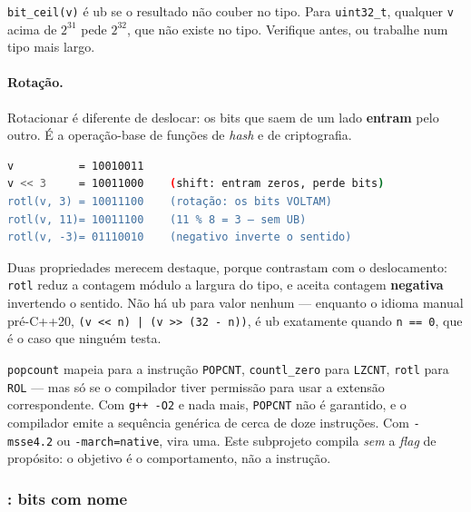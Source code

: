 \begin{armadilha}
\texttt{bit\_ceil(v)} é \gls{ub} se o resultado não couber no tipo. Para
\texttt{uint32\_t}, qualquer \texttt{v} acima de $2^{31}$ pede $2^{32}$, que não
existe no tipo. Verifique antes, ou trabalhe num tipo mais largo.
\end{armadilha}

\paragraph{Rotação.} Rotacionar é diferente de deslocar: os bits que saem de um
lado \textbf{entram} pelo outro. É a operação-base de funções de \emph{hash} e
de criptografia.

\begin{lstlisting}[style=bt, language=bash,
    caption={Saída de \texttt{src/bits/}: deslocamento contra rotação.}]
v          = 10010011
v << 3     = 10011000    (shift: entram zeros, perde bits)
rotl(v, 3) = 10011100    (rotação: os bits VOLTAM)
rotl(v, 11)= 10011100    (11 % 8 = 3 — sem UB)
rotl(v, -3)= 01110010    (negativo inverte o sentido)
\end{lstlisting}

Duas propriedades merecem destaque, porque contrastam com o deslocamento:
\texttt{rotl} reduz a contagem módulo a largura do tipo, e aceita contagem
\textbf{negativa} invertendo o sentido. Não há \gls{ub} para valor nenhum ---
enquanto o idioma manual pré-C++20, \texttt{(v << n) | (v >> (32 - n))}, é
\gls{ub} exatamente quando \texttt{n == 0}, que é o caso que ninguém testa.

\begin{armadilha}
\texttt{popcount} mapeia para a instrução \texttt{POPCNT}, \texttt{countl\_zero}
para \texttt{LZCNT}, \texttt{rotl} para \texttt{ROL} --- mas só se o compilador
tiver permissão para usar a extensão correspondente. Com \texttt{g++ -O2} e
nada mais, \texttt{POPCNT} não é garantido, e o compilador emite a sequência
genérica de cerca de doze instruções. Com \texttt{-msse4.2} ou
\texttt{-march=native}, vira uma. Este subprojeto compila \emph{sem} a
\emph{flag} de propósito: o objetivo é o comportamento, não a instrução.
\end{armadilha}

\subsubsection{: bits com nome}


